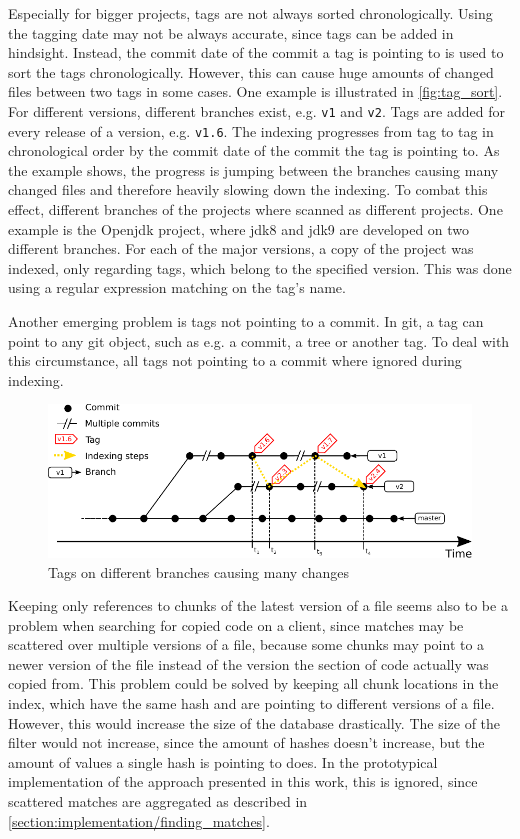 Especially for bigger projects, tags are not always sorted chronologically.
Using the tagging date may not be always accurate, since tags can be added in hindsight.
Instead, the commit date of the commit a tag is pointing to is used to sort the tags chronologically.
However, this can cause huge amounts of changed files between two tags in some cases.
One example is illustrated in \autoref{fig:tag_sort}.
For different versions, different branches exist, e.g. \texttt{v1} and \texttt{v2}.
Tags are added for every release of a version, e.g. \texttt{v1.6}.
The indexing progresses from tag to tag in chronological order by the commit date of the commit the tag is pointing to.
As the example shows, the progress is jumping between the branches causing many changed files and therefore heavily slowing down the indexing.
To combat this effect, different branches of the projects where scanned as different projects.
One example is the Openjdk project, where jdk8 and jdk9 are developed on two different branches.
For each of the major versions, a copy of the project was indexed, only regarding tags, which belong to the specified version.
This was done using a regular expression matching on the tag's name.

Another emerging problem is tags not pointing to a commit.
In git, a tag can point to any git object, such as e.g. a commit, a tree or another tag.
To deal with this circumstance, all tags not pointing to a commit where ignored during indexing.

\begin{figure}[h]
	\centering
	\includegraphics{figures/tag_sort.pdf}
	\caption{Tags on different branches causing many changes}\label{fig:tag_sort}
\end{figure}

Keeping only references to chunks of the latest version of a file seems also to be a problem when searching for copied code on a client, since matches may be scattered over multiple versions of a file, because some chunks may point to a newer version of the file instead of the version the section of code actually was copied from.
This problem could be solved by keeping all chunk locations in the index, which have the same hash and are pointing to different versions of a file.
However, this would increase the size of the database drastically.
The size of the filter would not increase, since the amount of hashes doesn't increase, but the amount of values a single hash is pointing to does.
In the prototypical implementation of the approach presented in this work, this is ignored, since scattered matches are aggregated as described in \autoref{section:implementation/finding_matches}.

